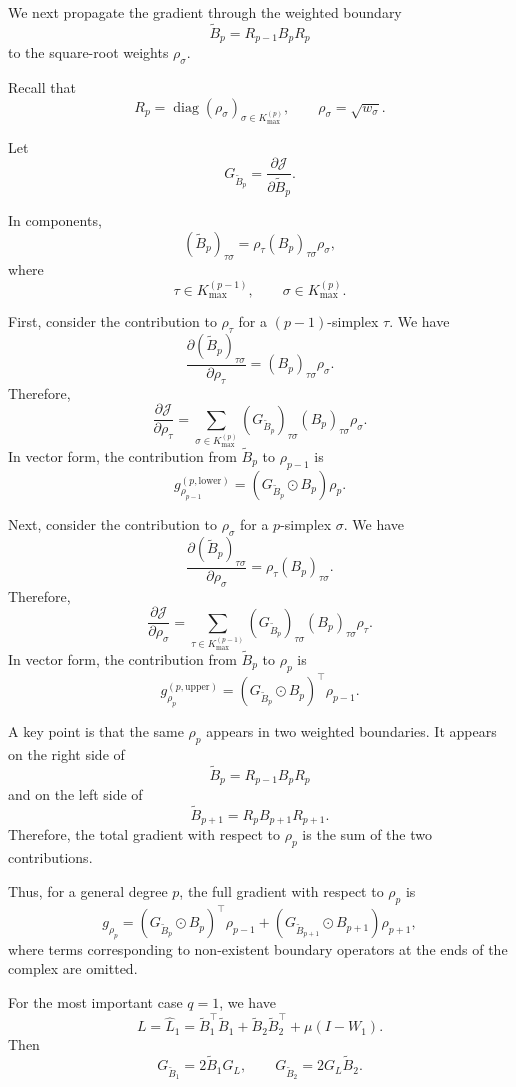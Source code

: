 \documentclass[pdflatex,sn-mathphys-ay]{sn-jnl}%
\theoremstyle{thmstyleone}%
\theoremstyle{thmstyletwo}%
\theoremstyle{thmstylethree}%
\begin{document}
\begin{appendices}
We next propagate the gradient through the weighted boundary
\[
\widetilde{B}_p
=
R_{p-1}B_pR_p
\]
to the square-root weights \(\rho_\sigma\).

Recall that
\[
R_p
=
\operatorname{diag}(\rho_\sigma)_{\sigma\in K_{\max}^{(p)}},
\qquad
\rho_\sigma=\sqrt{w_\sigma}.
\]

Let
\[
G_{\widetilde{B}_p}
=
\frac{\partial\mathcal{J}}{\partial \widetilde{B}_p}.
\]

In components,
\[
(\widetilde{B}_p)_{\tau\sigma}
=
\rho_\tau
(B_p)_{\tau\sigma}
\rho_\sigma,
\]
where
\[
\tau\in K_{\max}^{(p-1)},
\qquad
\sigma\in K_{\max}^{(p)}.
\]

First, consider the contribution to \(\rho_\tau\) for a \((p-1)\)-simplex \(\tau\). We have
\[
\frac{\partial(\widetilde{B}_p)_{\tau\sigma}}
{\partial \rho_\tau}
=
(B_p)_{\tau\sigma}\rho_\sigma.
\]
Therefore,
\[
\frac{\partial\mathcal{J}}{\partial \rho_\tau}
=
\sum_{\sigma\in K_{\max}^{(p)}}
(G_{\widetilde{B}_p})_{\tau\sigma}
(B_p)_{\tau\sigma}
\rho_\sigma.
\]
In vector form, the contribution from \(\widetilde{B}_p\) to \(\rho_{p-1}\) is
\[
g_{\rho_{p-1}}^{(p,\mathrm{lower})}
=
\left(
G_{\widetilde{B}_p}
\odot
B_p
\right)
\rho_p.
\]

Next, consider the contribution to \(\rho_\sigma\) for a \(p\)-simplex \(\sigma\). We have
\[
\frac{\partial(\widetilde{B}_p)_{\tau\sigma}}
{\partial \rho_\sigma}
=
\rho_\tau
(B_p)_{\tau\sigma}.
\]
Therefore,
\[
\frac{\partial\mathcal{J}}{\partial \rho_\sigma}
=
\sum_{\tau\in K_{\max}^{(p-1)}}
(G_{\widetilde{B}_p})_{\tau\sigma}
(B_p)_{\tau\sigma}
\rho_\tau.
\]
In vector form, the contribution from \(\widetilde{B}_p\) to \(\rho_p\) is
\[
g_{\rho_p}^{(p,\mathrm{upper})}
=
\left(
G_{\widetilde{B}_p}
\odot
B_p
\right)^\top
\rho_{p-1}.
\]

A key point is that the same \(\rho_p\) appears in two weighted boundaries. It appears on the right side of
\[
\widetilde{B}_p
=
R_{p-1}B_pR_p
\]
and on the left side of
\[
\widetilde{B}_{p+1}
=
R_pB_{p+1}R_{p+1}.
\]
Therefore, the total gradient with respect to \(\rho_p\) is the sum of the two contributions.

Thus, for a general degree \(p\), the full gradient with respect to \(\rho_p\) is
\[
g_{\rho_p}
=
\left(
G_{\widetilde{B}_p}
\odot
B_p
\right)^\top
\rho_{p-1}
+
\left(
G_{\widetilde{B}_{p+1}}
\odot
B_{p+1}
\right)
\rho_{p+1},
\]
where terms corresponding to non-existent boundary operators at the ends of the complex are omitted.

For the most important case \(q=1\), we have
\[
L
=
\widehat{L}_1
=
\widetilde{B}_1^\top\widetilde{B}_1
+
\widetilde{B}_2\widetilde{B}_2^\top
+
\mu(I-W_1).
\]
Then
\[
G_{\widetilde{B}_1}
=
2\widetilde{B}_1G_L,
\qquad
G_{\widetilde{B}_2}
=
2G_L\widetilde{B}_2.
\]


\end{appendices}
\end{document}
